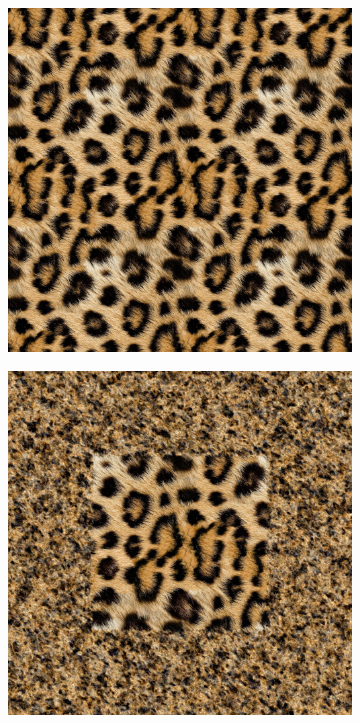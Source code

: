 \begin{figure}[!ht]
    \centering
      \begin{subfigure}{0.24\textwidth}
        \includegraphics[width=\textwidth]{img/ch6/mnet_extrapolation.png}
        \caption{} \label{fig:comp-a}
      \end{subfigure}
      \begin{subfigure}{0.24\textwidth}
        \includegraphics[width=\textwidth]{img/ch6/siren_extrapolation.png}

\end{subfigure}
\end{figure}
